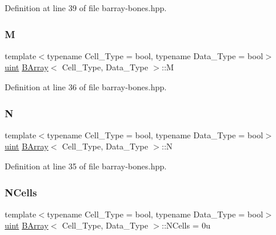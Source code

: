 Definition at line 39 of file barray-\/bones.\+hpp.

\mbox{\label{class_b_array_a197359753fd1bc054a1a14f7641d3fd1}} 
\subsubsection{\texorpdfstring{M}{M}}
{\footnotesize\ttfamily template$<$typename Cell\+\_\+\+Type = bool, typename Data\+\_\+\+Type = bool$>$ \\
\hyperlink{typedefs_8hpp_a91ad9478d81a7aaf2593e8d9c3d06a14}{uint} \hyperlink{class_b_array}{B\+Array}$<$ Cell\+\_\+\+Type, Data\+\_\+\+Type $>$\+::M}



Definition at line 36 of file barray-\/bones.\+hpp.

\mbox{\label{class_b_array_a4b34ec8636c989efe80bbe3f1cea217e}} 
\subsubsection{\texorpdfstring{N}{N}}
{\footnotesize\ttfamily template$<$typename Cell\+\_\+\+Type = bool, typename Data\+\_\+\+Type = bool$>$ \\
\hyperlink{typedefs_8hpp_a91ad9478d81a7aaf2593e8d9c3d06a14}{uint} \hyperlink{class_b_array}{B\+Array}$<$ Cell\+\_\+\+Type, Data\+\_\+\+Type $>$\+::N}



Definition at line 35 of file barray-\/bones.\+hpp.

\mbox{\label{class_b_array_a31fd64c6b54408ca98e07abc9c4241c5}} 
\subsubsection{\texorpdfstring{N\+Cells}{NCells}}
{\footnotesize\ttfamily template$<$typename Cell\+\_\+\+Type = bool, typename Data\+\_\+\+Type = bool$>$ \\
\hyperlink{typedefs_8hpp_a91ad9478d81a7aaf2593e8d9c3d06a14}{uint} \hyperlink{class_b_array}{B\+Array}$<$ Cell\+\_\+\+Type, Data\+\_\+\+Type $>$\+::N\+Cells = 0u}



